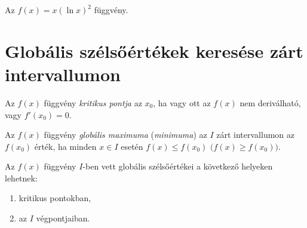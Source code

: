 \documentclass[11pt]{article}
\begin{document}
\begin{solution}
\begin{notefig}{Az $f(x)=x(\ln x)^{2}$ függvény.}
\end{notefig}
\end{solution}

\section{Globális szélsőértékek keresése zárt intervallumon}

\begin{defbox}
\begin{definition}
Az $f(x)$ függvény \emph{kritikus pontja} az $x_{0}$, ha vagy ott az $f(x)$ nem deriválható, vagy $f'(x_{0})=0$.
\end{definition}
\end{defbox}

\begin{defbox}
\begin{definition}
Az $f(x)$ függvény \emph{globális maximuma} (\emph{minimuma}) az $I$ zárt intervallumon az $f(x_{0})$ érték, ha minden $x\in I$ esetén $f(x)\le f(x_{0})$ $\bigl(f(x)\ge f(x_{0})\bigr)$.
\end{definition}
\end{defbox}

\noindent Az $f(x)$ függvény $I$-ben vett globális szélsőértékei a következő helyeken lehetnek:
\begin{enumerate}[label=\arabic*.]
\item kritikus pontokban,
\item az $I$ végpontjaiban.
\end{enumerate}
\end{document}
